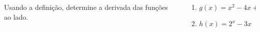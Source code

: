\begin{frame}
  \begin{columns}[onlytextwidth]
    \begin{column}{0.48\textwidth}\vspace{-0.5cm}
      \begin{example}
        Usando a definição, determine a derivada das funções ao lado.
      \end{example}
    \end{column}
    \begin{column}{0.5\textwidth}\vspace{-0.5cm}
      \begin{enumerate}
        \item $g(x) = x^{2} - 4x + 3$
        \item $h(x) = 2^{x} - 3x$
      \end{enumerate}
    \end{column}
  \end{columns}
\end{frame}
